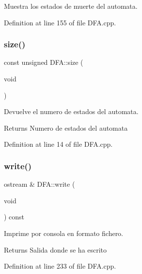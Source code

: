 Muestra los estados de muerte del automata. 



Definition at line 155 of file D\+F\+A.\+cpp.

\mbox{\label{class_d_f_a_a60333433beecab40b2e6eb8874de8524}} 
\subsubsection{\texorpdfstring{size()}{size()}}
{\footnotesize\ttfamily const unsigned D\+F\+A\+::size (\begin{DoxyParamCaption}\item[{void}]{ }\end{DoxyParamCaption})}



Devuelve el numero de estados del automata. 

\begin{DoxyReturn}{Returns}
Numero de estados del automata 
\end{DoxyReturn}


Definition at line 14 of file D\+F\+A.\+cpp.

\mbox{\label{class_d_f_a_a453bbd313adb90e3615694aad833b014}} 
\subsubsection{\texorpdfstring{write()}{write()}\hspace{0.1cm}{\footnotesize\ttfamily [1/2]}}
{\footnotesize\ttfamily ostream \& D\+F\+A\+::write (\begin{DoxyParamCaption}\item[{void}]{ }\end{DoxyParamCaption}) const}



Imprime por consola en formato fichero. 

\begin{DoxyReturn}{Returns}
Salida donde se ha escrito 
\end{DoxyReturn}


Definition at line 233 of file D\+F\+A.\+cpp.

\mbox{\label{class_d_f_a_aec27d0774ad67c7c29a5679e938fab5d}} 

